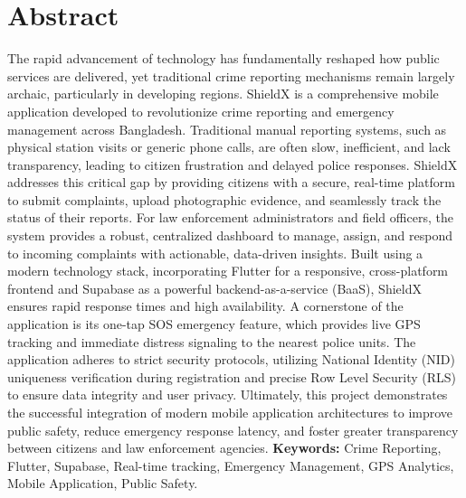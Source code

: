 \documentclass[12pt, a4paper, twoside]{report}
\begin{document}
\chapter*{Abstract}
The rapid advancement of technology has fundamentally reshaped how public services are delivered, yet traditional crime reporting mechanisms remain largely archaic, particularly in developing regions. ShieldX is a comprehensive mobile application developed to revolutionize crime reporting and emergency management across Bangladesh. Traditional manual reporting systems, such as physical station visits or generic phone calls, are often slow, inefficient, and lack transparency, leading to citizen frustration and delayed police responses. 
ShieldX addresses this critical gap by providing citizens with a secure, real-time platform to submit complaints, upload photographic evidence, and seamlessly track the status of their reports. For law enforcement administrators and field officers, the system provides a robust, centralized dashboard to manage, assign, and respond to incoming complaints with actionable, data-driven insights. Built using a modern technology stack, incorporating Flutter for a responsive, cross-platform frontend and Supabase as a powerful backend-as-a-service (BaaS), ShieldX ensures rapid response times and high availability. 
A cornerstone of the application is its one-tap SOS emergency feature, which provides live GPS tracking and immediate distress signaling to the nearest police units. The application adheres to strict security protocols, utilizing National Identity (NID) uniqueness verification during registration and precise Row Level Security (RLS) to ensure data integrity and user privacy. Ultimately, this project demonstrates the successful integration of modern mobile application architectures to improve public safety, reduce emergency response latency, and foster greater transparency between citizens and law enforcement agencies.
\vspace{0.5cm}
\noindent\textbf{Keywords:} Crime Reporting, Flutter, Supabase, Real-time tracking, Emergency Management, GPS Analytics, Mobile Application, Public Safety.
\tableofcontents
\clearpage
\listoffigures
{}
\listoftables
{}
\clearpage
\end{document}
